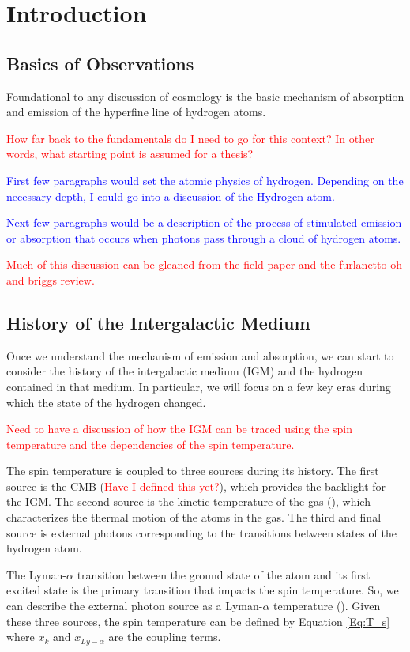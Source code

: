 \chapter{Introduction}\label{Ch:Intro}

\section{Basics of \cm Observations}
Foundational to any discussion of \cm cosmology is the basic mechanism of absorption and emission of the \cm hyperfine line of hydrogen atoms. 

\textcolor{red}{How far back to the fundamentals do I need to go for this context? In other words, what starting point is assumed for a thesis?}

\textcolor{blue}{First few paragraphs would set the atomic physics of hydrogen. Depending on the necessary depth, I could go into a discussion of the Hydrogen atom.}

\textcolor{blue}{Next few paragraphs would be a description of the process of stimulated emission or absorption that occurs when \cm photons pass through a cloud of hydrogen atoms.}

\textcolor{red}{Much of this discussion can be gleaned from the field paper and the furlanetto oh and briggs review.}

\section{History of the Intergalactic Medium}
Once we understand the mechanism of \cm emission and absorption, we can start to consider the history of the intergalactic medium (IGM) and the hydrogen contained in that medium. In particular, we will focus on a few key eras during which the state of the hydrogen changed. 

\textcolor{red}{Need to have a discussion of how the IGM can be traced using the \cm spin temperature and the dependencies of the spin temperature. }

The spin temperature is coupled to three sources during its history. The first source is the CMB (\tg \textcolor{red}{Have I defined this yet?}), which provides the backlight for the IGM. The second source is the kinetic temperature of the gas (\tk), which characterizes the thermal motion of the atoms in the gas. The third and final source is external photons corresponding to the transitions between states of the hydrogen atom. 

The Lyman-$\alpha$ transition between the ground state of the atom and its first excited state is the primary transition that impacts the spin temperature. So, we can describe the external photon source as a Lyman-$\alpha$ temperature (\tl). Given these three sources, the spin temperature can be defined by Equation \ref{Eq:T_s} where $x_k$ and $x_{Ly-\alpha}$ are the coupling terms. 

